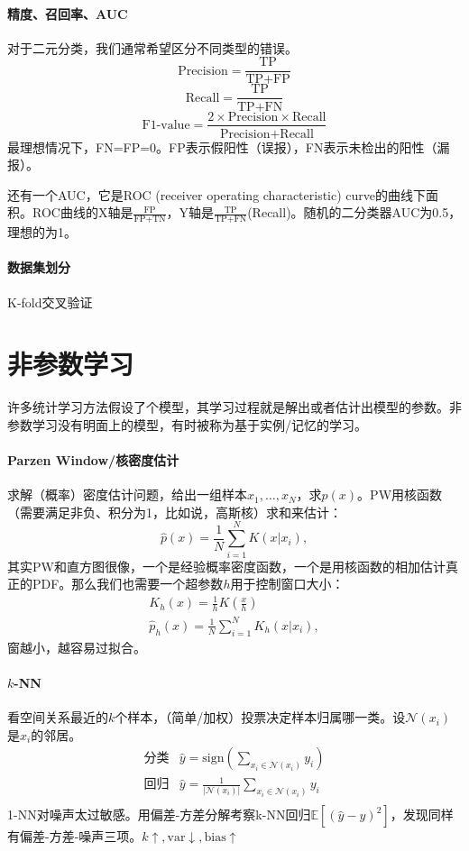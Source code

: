 \paragraph{精度、召回率、AUC}
对于二元分类，我们通常希望区分不同类型的错误。
$$\text{Precision} = \frac{\text{TP}}{\text{TP} + \text{FP}}$$
$$\text{Recall} = \frac{\text{TP}}{\text{TP} + \text{FN}}$$
$$\text{F1-value} = \frac{2\times\text{Precision}\times\text{Recall}}{\text{Precision} + \text{Recall}}$$
最理想情况下，FN=FP=0。FP表示假阳性（误报），FN表示未检出的阳性（漏报）。

还有一个AUC，它是ROC (receiver operating characteristic) curve的曲线下面积。ROC曲线的X轴是$\frac{\text{FP}}{\text{FP} + \text{TN}}$，Y轴是$\frac{\text{TP}}{\text{TP} + \text{FN}}$(Recall)。随机的二分类器AUC为0.5，理想的为1。

\paragraph{数据集划分} K-fold交叉验证

\section{非参数学习}
许多统计学习方法假设了个模型，其学习过程就是解出或者估计出模型的参数。非参数学习没有明面上的模型，有时被称为基于实例/记忆的学习。
\paragraph{Parzen Window/核密度估计}
求解（概率）密度估计问题，给出一组样本$x_1,\ldots,x_N$，求$p(x)$。PW用核函数（需要满足非负、积分为1，比如说，高斯核）求和来估计：
$$\hat{p}(x) = \frac{1}{N}\sum^N_{i=1}K(x|x_i),$$
其实PW和直方图很像，一个是经验概率密度函数，一个是用核函数的相加估计真正的PDF。那么我们也需要一个超参数$h$用于控制窗口大小：
$$
\begin{array}{l}
K_h(x) = \frac{1}{h}K(\frac{x}{h}) \\
\hat{p}_h(x) = \frac{1}{N}\sum^N_{i=1}K_h(x|x_i),
\end{array}
$$
窗越小，越容易过拟合。

\paragraph{$k$-NN}看空间关系最近的$k$个样本，（简单/加权）投票决定样本归属哪一类。设$\mathcal{N}(x_i)$是$x_i$的邻居。
$$
\begin{array}{ll}
\text{分类} & \hat{y} = \mathrm{sign}(\sum_{x_i \in \mathcal{N}(x_i)} y_i) \\
\text{回归} & \hat{y} = \frac{1}{|\mathcal{N}(x_i)|} \sum_{x_i \in \mathcal{N}(x_i)} y_i \\
\end{array}
$$
1-NN对噪声太过敏感。用偏差-方差分解考察k-NN回归$\mathbb{E}[(\hat{y} - y)^2]$，发现同样有偏差-方差-噪声三项。$k\uparrow,\text{var} \downarrow,\text{bias} \uparrow$

